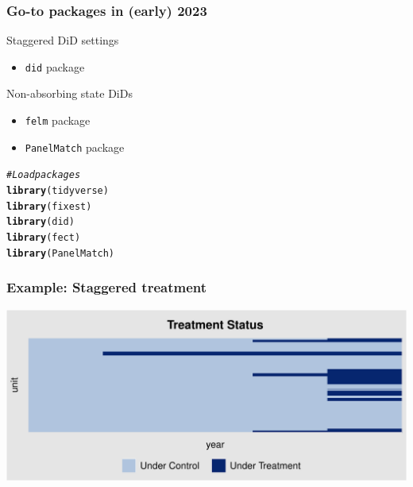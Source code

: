 \documentclass[12pt,aspectratio=169]{beamer}\usepackage[]{graphicx}\usepackage[]{xcolor}
\makeatletter
\def\maxwidth{ %
  \ifdim\Gin@nat@width>\linewidth
    \linewidth
  \else
    \Gin@nat@width
  \fi
}
\newcommand{\hlcom}[1]{\textcolor[rgb]{0.678,0.584,0.686}{\textit{#1}}}%
\newcommand{\hlstd}[1]{\textcolor[rgb]{0.345,0.345,0.345}{#1}}%
\newcommand{\hlkwd}[1]{\textcolor[rgb]{0.737,0.353,0.396}{\textbf{#1}}}%
\newenvironment{kframe}{%
 \def\at@end@of@kframe{}%
 \ifinner\ifhmode%
  \def\at@end@of@kframe{\end{minipage}}%
  \begin{minipage}{\columnwidth}%
 \fi\fi%
 \def\FrameCommand##1{\hskip\@totalleftmargin \hskip-\fboxsep
 \colorbox{shadecolor}{##1}\hskip-\fboxsep
     \hskip-\linewidth \hskip-\@totalleftmargin \hskip\columnwidth}%
 \MakeFramed {\advance\hsize-\width
   \@totalleftmargin\z@ \linewidth\hsize
   \@setminipage}}%
 {\par\unskip\endMakeFramed%
 \at@end@of@kframe}
\newenvironment{knitrout}{}{} %
\makeatother
\begin{document}
\begin{frame}[fragile]
    \frametitle{Go-to packages in (early) 2023}


    \begin{alertblock}{Staggered DiD settings}
    \small

    \begin{itemize}[itemsep=0em, topsep=0pt]
        \item \texttt{did} package
    \end{itemize}

    \end{alertblock}

    \begin{alertblock}{Non-absorbing state DiDs}
    \small

    \begin{itemize}[itemsep=0em, topsep=0pt]
        \item \texttt{felm} package
        \item \texttt{PanelMatch} package
    \end{itemize}

    \end{alertblock}
    \small

\begin{knitrout}
\color{fgcolor}\begin{kframe}
\begin{alltt}
\hlcom{# Load packages}
\hlkwd{library}\hlstd{(tidyverse)}
\hlkwd{library}\hlstd{(fixest)}
\hlkwd{library}\hlstd{(did)}
\hlkwd{library}\hlstd{(fect)}
\hlkwd{library}\hlstd{(PanelMatch)}
\end{alltt}
\end{kframe}
\end{knitrout}

\end{frame}


\begin{frame}[fragile]
    \frametitle{Example: Staggered treatment}
    \scriptsize
\begin{knitrout}
\color{fgcolor}

{\centering \includegraphics[width=\maxwidth]{figure/unnamed-chunk-3-1} 

}


\end{knitrout}

\end{frame}
\end{document}
